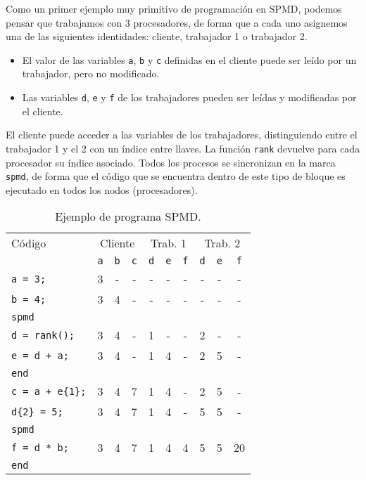 \begin{ejemplo}
    Como un primer ejemplo muy primitivo de programación en SPMD, podemos pensar que trabajamos con 3 procesadores, de forma que a cada uno asignemos una de las siguientes identidades: cliente, trabajador 1 o trabajador 2.
    \begin{itemize}
        \item El valor de las variables \verb|a|, \verb|b| y \verb|c| definidas en el cliente puede ser leído por un trabajador, pero no modificado.
        \item Las variables \verb|d|, \verb|e| y \verb|f| de los trabajadores pueden ser leídas y modificadas por el cliente.
    \end{itemize}
    El cliente puede acceder a las variables de los trabajadores, distinguiendo entre el trabajador 1 y el 2 con un índice entre llaves. La función \verb|rank| devuelve para cada procesador su índice asociado. Todos los procesos se sincronizan en la marca \verb|spmd|, de forma que el código que se encuentra dentro de este tipo de bloque es ejecutado en todos los nodos (procesadores).

    \begin{table}
    \centering
    \begin{tabular}{|l|ccc|ccc|ccc|}
        \hline
        Código & \multicolumn{3}{c|}{Cliente} & \multicolumn{3}{c|}{Trab. 1} & \multicolumn{3}{c|}{Trab. 2} \\
               & \verb|a| & \verb|b| & \verb|c| & \verb|d| & \verb|e| & \verb|f| & \verb|d| & \verb|e| & \verb|f| \\
        \hline
        \verb|a = 3;| & 3 & - & - & - & - & - & - & - & - \\
        \verb|b = 4;| & 3 & 4 & - & - & - & - & - & - & - \\
        \verb|spmd| &   &   &   &   &   &   &   &   &   \\
        \verb|d = rank();| & 3 & 4 & - & 1 & - & - & 2 & - & - \\
        \verb|e = d + a;| & 3 & 4 & - & 1 & 4 & - & 2 & 5 & - \\
        \verb|end| &   &   &   &   &   &   &   &   &   \\
        \verb|c = a + e{1};| & 3 & 4 & 7 & 1 & 4 & - & 2 & 5 & - \\
        \verb|d{2} = 5;| & 3 & 4 & 7 & 1 & 4 & - & 5 & 5 & - \\
        \verb|spmd| &   &   &   &   &   &   &   &   &   \\
        \verb|f = d * b;| & 3 & 4 & 7 & 1 & 4 & 4 & 5 & 5 & 20 \\
        \verb|end| &   &   &   &   &   &   &   &   &    \\
        \hline
    \end{tabular}
    \caption{Ejemplo de programa SPMD.}
    \end{table}
\end{ejemplo}


